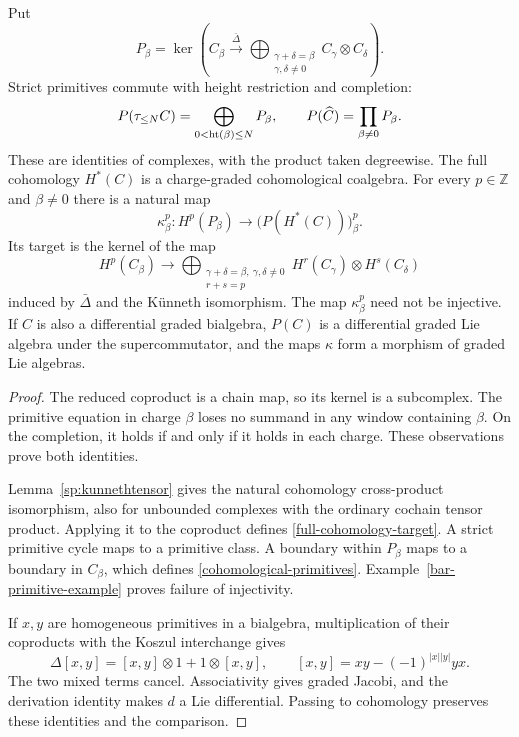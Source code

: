 \begin{proposition}
\label{primitive-comparison}
Put
\[
 P_\beta=\ker\left(C_\beta\xrightarrow{\bar\Delta}
 \bigoplus_{\substack{\gamma+\delta=\beta\\\gamma,\delta\neq0}}
 C_\gamma\otimes C_\delta\right).
\]
Strict primitives commute with height restriction and completion:
\[
 P(\tau_{\leq N}C)=\bigoplus_{0<\operatorname{ht}(\beta)\leq N}P_\beta,
 \qquad P(\widehat C)=\prod_{\beta\neq0}P_\beta.
\]
These are identities of complexes, with the product taken degreewise.
The full cohomology $H^*(C)$ is a charge-graded cohomological coalgebra.
For every $p\in\mathbb Z$ and $\beta\neq0$ there is a natural map
\begin{equation}
 \kappa_\beta^p:H^p(P_\beta)
 \longrightarrow\bigl(P(H^*(C))\bigr)^p_\beta.
 \label{cohomological-primitives}
\end{equation}
Its target is the kernel of the map
\begin{equation}
 H^p(C_\beta)\longrightarrow
 \bigoplus_{\substack{\gamma+\delta=\beta,\ \gamma,\delta\neq0\\r+s=p}}
 H^r(C_\gamma)\otimes H^s(C_\delta)
 \label{full-cohomology-target}
\end{equation}
induced by $\bar\Delta$ and the K\"unneth isomorphism.
The map $\kappa_\beta^p$ need not be injective.
If $C$ is also a differential graded bialgebra, $P(C)$ is a differential
graded Lie algebra under the supercommutator, and the maps $\kappa$ form
a morphism of graded Lie algebras.
\end{proposition}

\begin{proof}
The reduced coproduct is a chain map, so its kernel is a subcomplex.
The primitive equation in charge $\beta$ loses no summand in any window
containing $\beta$.  On the completion, it holds if and only if it holds
in each charge.  These observations prove both identities.

Lemma~\ref{sp:kunnethtensor} gives the natural cohomology cross-product
isomorphism, also for unbounded complexes with the ordinary cochain
tensor product. Applying it to the coproduct defines
\eqref{full-cohomology-target}.  A strict primitive cycle maps to a
primitive class.  A boundary within $P_\beta$ maps to a boundary in
$C_\beta$, which defines \eqref{cohomological-primitives}.
Example~\ref{bar-primitive-example} proves failure of injectivity.

If $x,y$ are homogeneous primitives in a bialgebra, multiplication of
their coproducts with the Koszul interchange gives
\[
 \Delta[x,y]=[x,y]\otimes1+1\otimes[x,y],
 \qquad [x,y]=xy-(-1)^{|x||y|}yx.
\]
The two mixed terms cancel.  Associativity gives graded Jacobi, and
the derivation identity makes $d$ a Lie differential.
Passing to cohomology preserves these identities and the comparison.
\end{proof}


